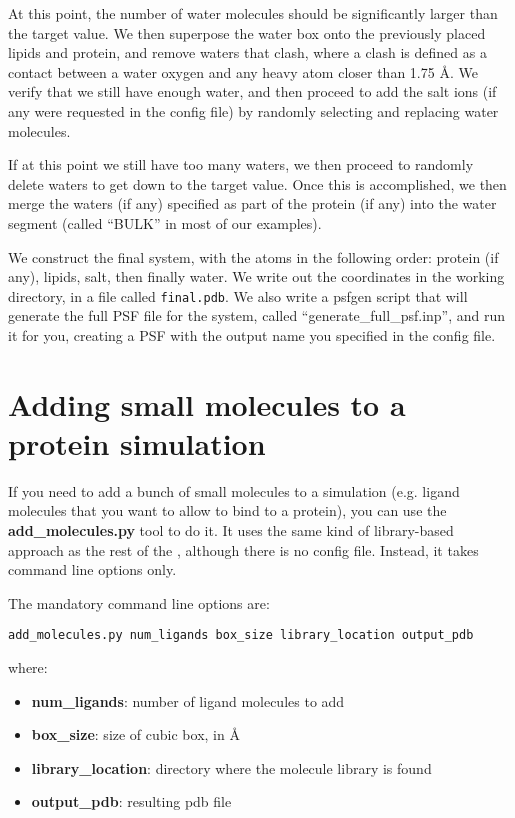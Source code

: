 \documentclass[12pt]{article}
\begin{document}
At this point, the number of water molecules should be significantly larger
than the target value.  We then superpose the water box onto the previously
placed lipids and protein, and remove waters that clash, where a clash is
defined as a contact between a water oxygen and any heavy atom closer than 1.75
{\AA}.  We verify that we still have enough water, and then proceed to add
the salt ions (if any were requested in the config file) by randomly
selecting and replacing water molecules.

If at this point we still have too many waters, we then proceed to randomly
delete waters to get down to the target value.  Once this is accomplished, we
then merge the waters (if any) specified as part of the protein (if any) into
the water segment (called ``BULK'' in most of our examples).

We construct the final system, with the atoms in the following order: protein
(if any), lipids, salt, then finally water.  We write out the coordinates in
the working directory, in a file called {\tt final.pdb}.  We also write a
psfgen script that will generate the full PSF file for the system, called
``generate\_full\_psf.inp'', and run it for you, creating a PSF with the
output name you specified in the config file.

\section{Adding small molecules to a protein simulation}

If you need to add a bunch of small molecules to a simulation (e.g. ligand molecules that you want to allow to bind to a protein), you can use the {\bf add\_molecules.py} tool to do it.  It uses the same kind of library-based approach as the rest of the {\omgwtf}, although there is no config file. Instead, it takes command line options only.

The mandatory command line options are:

{\tt add\_molecules.py num\_ligands box\_size library\_location output\_pdb}

where:
\begin{itemize}
    \item {\bf num\_ligands}: number of ligand molecules to add
    \item {\bf box\_size}: size of cubic box, in {\AA}
    \item {\bf library\_location}: directory where the molecule library is found
    \item {\bf output\_pdb}: resulting pdb file
\end{itemize}
\end{document}
